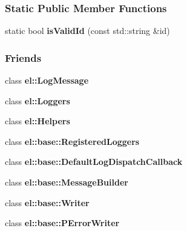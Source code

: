 \subsubsection*{Static Public Member Functions}
\begin{DoxyCompactItemize}
\item 
\hypertarget{a00048_af6cf4f266ceb65da9563afd3706f26d6}{}static bool {\bfseries is\+Valid\+Id} (const std\+::string \&id)\label{a00048_af6cf4f266ceb65da9563afd3706f26d6}

\end{DoxyCompactItemize}
\subsubsection*{Friends}
\begin{DoxyCompactItemize}
\item 
\hypertarget{a00048_a22965b691242a9f61d443ba03fce3e35}{}class {\bfseries el\+::\+Log\+Message}\label{a00048_a22965b691242a9f61d443ba03fce3e35}

\item 
\hypertarget{a00048_a6efe246b312d02731fb0e1d120c0331d}{}class {\bfseries el\+::\+Loggers}\label{a00048_a6efe246b312d02731fb0e1d120c0331d}

\item 
\hypertarget{a00048_a2fb8a2c02cbf86247f093c118bed877a}{}class {\bfseries el\+::\+Helpers}\label{a00048_a2fb8a2c02cbf86247f093c118bed877a}

\item 
\hypertarget{a00048_a574ecee25e8d578f76060a95a2fe7c9e}{}class {\bfseries el\+::base\+::\+Registered\+Loggers}\label{a00048_a574ecee25e8d578f76060a95a2fe7c9e}

\item 
\hypertarget{a00048_a42b1de96d584ae4fecbfc2b9aff95052}{}class {\bfseries el\+::base\+::\+Default\+Log\+Dispatch\+Callback}\label{a00048_a42b1de96d584ae4fecbfc2b9aff95052}

\item 
\hypertarget{a00048_a81bbf6fe31fab133d182efa8367304f1}{}class {\bfseries el\+::base\+::\+Message\+Builder}\label{a00048_a81bbf6fe31fab133d182efa8367304f1}

\item 
\hypertarget{a00048_a7a728edbb2761d151832daa74d5b2736}{}class {\bfseries el\+::base\+::\+Writer}\label{a00048_a7a728edbb2761d151832daa74d5b2736}

\item 
\hypertarget{a00048_a2a368b9be1b8d6a29d4bb92a11807f39}{}class {\bfseries el\+::base\+::\+P\+Error\+Writer}\label{a00048_a2a368b9be1b8d6a29d4bb92a11807f39}


\end{DoxyCompactItemize}
